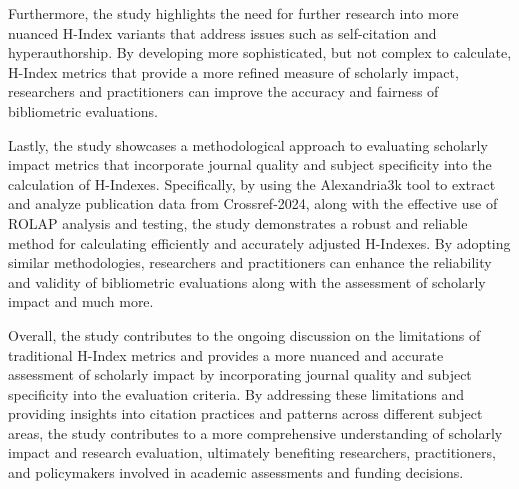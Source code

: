 Furthermore, the study highlights the need for further research into more
nuanced H-Index variants that address issues such as self-citation and
hyperauthorship. By developing more sophisticated, but not complex to
calculate, H-Index metrics that provide a more refined measure of scholarly
impact, researchers and practitioners can improve the accuracy and fairness of
bibliometric evaluations.

Lastly, the study showcases a methodological approach to evaluating scholarly
impact metrics that incorporate journal quality and subject specificity into
the calculation of H-Indexes. Specifically, by using the Alexandria3k tool to
extract and analyze publication data from Crossref-2024, along with the
effective use of ROLAP analysis and testing, the study demonstrates a robust
and reliable method for calculating efficiently and accurately adjusted
H-Indexes. By adopting similar methodologies, researchers and practitioners can
enhance the reliability and validity of bibliometric evaluations along with the
assessment of scholarly impact and much more.

Overall, the study contributes to the ongoing discussion on the limitations of
traditional H-Index metrics and provides a more nuanced and accurate assessment
of scholarly impact by incorporating journal quality and subject specificity
into the evaluation criteria. By addressing these limitations and providing
insights into citation practices and patterns across different subject areas,
the study contributes to a more comprehensive understanding of scholarly impact
and research evaluation, ultimately benefiting researchers, practitioners, and
policymakers involved in academic assessments and funding decisions. %
